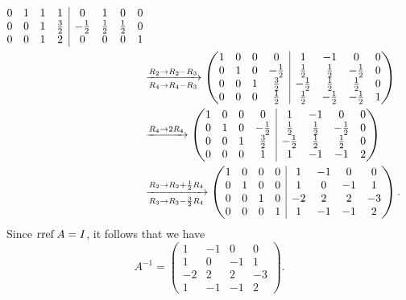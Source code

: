 \documentclass[main.tex]{subfiles}
\begin{document}
\begin{soln}
\begin{align*}
{\begin{array}{@{}c c c c | c c c c@{}}
            0 & 1 & 1 & 1 & 0 & 1 & 0 & 0 \\
            0 & 0 & 1 & \frac{3}{2} & -\frac{1}{2} & \frac{1}{2} & \frac{1}{2} & 0 \\
            0 & 0 & 1 & 2 & 0 & 0 & 0 & 1
        \end{array}} \\
        &\xrightarrow[R_4\to R_4 - R_3]{R_2\to R_2 - R_3}
        \parens{\begin{array}{@{}c c c c | c c c c@{}}
            1 & 0 & 0 & 0 & 1 & -1 & 0 & 0 \\
            0 & 1 & 0 & -\frac{1}{2} & \frac{1}{2} & \frac{1}{2} & -\frac{1}{2} & 0 \\
            0 & 0 & 1 & \frac{3}{2} & -\frac{1}{2} & \frac{1}{2} & \frac{1}{2} & 0 \\
            0 & 0 & 0 & \frac{1}{2} & \frac{1}{2} & -\frac{1}{2} & -\frac{1}{2} & 1
        \end{array}} \\
        &\xrightarrow{R_4\to 2R_4}
        \parens{\begin{array}{@{}c c c c | c c c c@{}}
            1 & 0 & 0 & 0 & 1 & -1 & 0 & 0 \\
            0 & 1 & 0 & -\frac{1}{2} & \frac{1}{2} & \frac{1}{2} & -\frac{1}{2} & 0 \\
            0 & 0 & 1 & \frac{3}{2} & -\frac{1}{2} & \frac{1}{2} & \frac{1}{2} & 0 \\
            0 & 0 & 0 & 1 & 1 & -1 & -1 & 2
        \end{array}} \\
        &\xrightarrow[R_3\to R_3 - \frac{3}{2}R_4]{R_2\to R_2 + \frac{1}{2}R_4}
        \parens{\begin{array}{@{}c c c c | c c c c@{}}
            1 & 0 & 0 & 0 & 1 & -1 & 0 & 0 \\
            0 & 1 & 0 & 0 & 1 & 0 & -1 & 1 \\
            0 & 0 & 1 & 0 & -2 & 2 & 2 & -3 \\
            0 & 0 & 0 & 1 & 1 & -1 & -1 & 2
        \end{array}}.
    \end{align*}
    Since $\operatorname{rref} A = I$, it follows that we have
    \[A^{-1} = \boxed{\begin{pmatrix}
        1 & -1 & 0 & 0 \\
        1 & 0 & -1 & 1 \\
        -2 & 2 & 2 & -3 \\
        1 & -1 & -1 & 2
    \end{pmatrix}}.\]
\end{soln}
\eject
\end{document}
